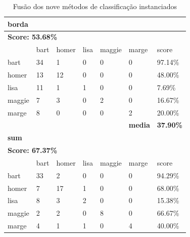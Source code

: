 \documentclass[journal]{IEEEtran}
\begin{document}
\begin{table}[!htb]
\centering
\caption{Fusão dos nove métodos de classificação instanciados}
\label{tbl:fusionall}
\small
\singlespacing
\begin{tabular}{l|l|l|l|l|l|l}
\hline
\multicolumn{7}{l}{\textbf{borda}}                                                          \\ \hline
\multicolumn{7}{l}{\textbf{Score: 53.68\%}}                                                 \\ \hline
          & bart      & homer     & lisa      & maggie    & marge          & score            \\ \hline
bart      & 34        & 1         & 0         & 0         & 0              & 97.14\%          \\ \hline
homer     & 13        & 12        & 0         & 0         & 0              & 48.00\%          \\ \hline
lisa      & 11        & 1         & 1         & 0         & 0              & 7.69\%           \\ \hline
maggie    & 7         & 3         & 0         & 2         & 0              & 16.67\%          \\ \hline
marge     & 8         & 0         & 0         & 0         & 2              & 20.00\%          \\ \hline
\textbf{} & \textbf{} & \textbf{} & \textbf{} & \textbf{} & \textbf{media} & \textbf{37.90\%} \\ \hline
\multicolumn{7}{l}{\textbf{sum}}                                                            \\ \hline
\multicolumn{7}{l}{\textbf{Score: 67.37\%}}                                                 \\ \hline
          & bart      & homer     & lisa      & maggie    & marge          & score            \\ \hline
bart      & 33        & 2         & 0         & 0         & 0              & 94.29\%          \\ \hline
homer     & 7         & 17        & 1         & 0         & 0              & 68.00\%          \\ \hline
lisa      & 8         & 3         & 2         & 0         & 0              & 15.38\%          \\ \hline
maggie    & 2         & 2         & 0         & 8         & 0              & 66.67\%          \\ \hline
marge     & 4         & 1         & 1         & 0         & 4              & 40.00\%          \\ \hline

\end{tabular}
\end{table}
\end{document}
